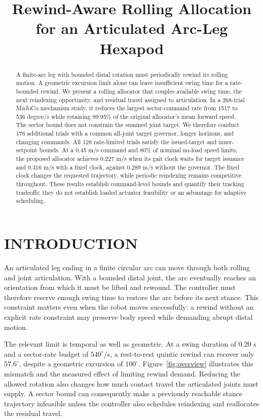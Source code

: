 \documentclass[letterpaper,10pt,conference]{ieeeconf}
\title{\LARGE\bf Rewind-Aware Rolling Allocation\\for an Articulated Arc-Leg Hexapod}
\author{\mbox{}}
\begin{document}
\maketitle\thispagestyle{empty}\pagestyle{empty}
\begin{abstract}
A finite-arc leg with bounded distal rotation must periodically rewind its rolling motion. A geometric excursion limit alone can leave insufficient swing time for a rate-bounded rewind. We present a rolling allocator that couples available swing time, the next reindexing opportunity, and residual travel assigned to articulation. In a 268-trial MuJoCo mechanism study, it reduces the largest sector-command rate from 1517 to 536 degree/s while retaining 99.95\% of the original allocator's mean forward speed. The sector bound does not constrain the summed joint target. We therefore conduct 176 additional trials with a common all-joint target governor, longer horizons, and changing commands. All 128 rate-limited trials satisfy the issued-target and inner-setpoint bounds. At a 0.45 m/s command and 80\% of nominal no-load speed limits, the proposed allocator achieves 0.227 m/s when its gait clock waits for target issuance and 0.316 m/s with a fixed clock, against 0.289 m/s without the governor. The fixed clock changes the requested trajectory, while periodic reindexing remains competitive throughout. These results establish command-level bounds and quantify their tracking tradeoffs; they do not establish loaded actuator feasibility or an advantage for adaptive scheduling.
\end{abstract}

\section{INTRODUCTION}
An articulated leg ending in a finite circular arc can move through both rolling and joint articulation. With a bounded distal joint, the arc eventually reaches an orientation from which it must be lifted and rewound. The controller must therefore reserve enough swing time to restore the arc before its next stance. This constraint matters even when the robot moves successfully: a rewind without an explicit rate constraint may preserve body speed while demanding abrupt distal motion.

The relevant limit is temporal as well as geometric. At a swing duration of 0.20 s and a sector-rate budget of $540^\circ$/s, a rest-to-rest quintic rewind can recover only $57.6^\circ$, despite a geometric excursion of $100^\circ$. Figure~\ref{fig:overview} illustrates this mismatch and the measured effect of limiting rewind demand. Reducing the allowed rotation also changes how much contact travel the articulated joints must supply. A sector bound can consequently make a previously reachable stance trajectory infeasible unless the controller also schedules reindexing and reallocates the residual travel.
\end{document}
